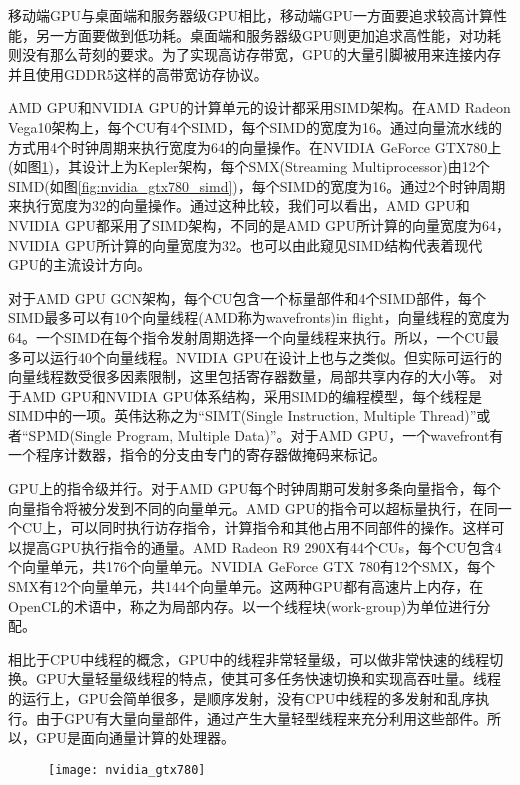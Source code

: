 移动端GPU与桌面端和服务器级GPU相比，移动端GPU一方面要追求较高计算性能，另一方面要做到低功耗。桌面端和服务器级GPU则更加追求高性能，对功耗则没有那么苛刻的要求。为了实现高访存带宽，GPU的大量引脚被用来连接内存并且使用GDDR5这样的高带宽访存协议。

AMD GPU和NVIDIA GPU的计算单元的设计都采用SIMD架构。在AMD Radeon Vega10架构上，每个CU有4个SIMD，每个SIMD的宽度为16。通过向量流水线的方式用4个时钟周期来执行宽度为64的向量操作。在NVIDIA GeForce GTX780上(如图\ref{fig:nvidia_gtx780})，其设计上为Kepler架构，每个SMX(Streaming Multiprocessor)由12个SIMD(如图\ref{fig:nvidia_gtx780_simd})，每个SIMD的宽度为16。通过2个时钟周期来执行宽度为32的向量操作。通过这种比较，我们可以看出，AMD GPU和NVIDIA GPU都采用了SIMD架构，不同的是AMD GPU所计算的向量宽度为64，NVIDIA GPU所计算的向量宽度为32。也可以由此窥见SIMD结构代表着现代GPU的主流设计方向。

对于AMD GPU GCN架构，每个CU包含一个标量部件和4个SIMD部件，每个SIMD最多可以有10个向量线程(AMD称为wavefronts)in flight，向量线程的宽度为64。一个SIMD在每个指令发射周期选择一个向量线程来执行。所以，一个CU最多可以运行40个向量线程。NVIDIA GPU在设计上也与之类似。但实际可运行的向量线程数受很多因素限制，这里包括寄存器数量，局部共享内存的大小等。
对于AMD GPU和NVIDIA GPU体系结构，采用SIMD的编程模型，每个线程是SIMD中的一项。英伟达称之为“SIMT(Single Instruction, Multiple Thread)”或者“SPMD(Single Program, Multiple Data)”。对于AMD GPU，一个wavefront有一个程序计数器，指令的分支由专门的寄存器做掩码来标记。

GPU上的指令级并行。对于AMD GPU每个时钟周期可发射多条向量指令，每个向量指令将被分发到不同的向量单元。AMD GPU的指令可以超标量执行，在同一个CU上，可以同时执行访存指令，计算指令和其他占用不同部件的操作。这样可以提高GPU执行指令的通量。AMD Radeon R9 290X有44个CUs，每个CU包含4个向量单元，共176个向量单元。NVIDIA GeForce GTX 780有12个SMX，每个SMX有12个向量单元，共144个向量单元。这两种GPU都有高速片上内存，在OpenCL的术语中，称之为局部内存。以一个线程块(work-group)为单位进行分配。

相比于CPU中线程的概念，GPU中的线程非常轻量级，可以做非常快速的线程切换。GPU大量轻量级线程的特点，使其可多任务快速切换和实现高吞吐量。线程的运行上，GPU会简单很多，是顺序发射，没有CPU中线程的多发射和乱序执行。由于GPU有大量向量部件，通过产生大量轻型线程来充分利用这些部件。所以，GPU是面向通量计算的处理器。
\begin{figure}[htbp]
	\centering
	\texttt{[image: nvidia\_gtx780]}
	\label{fig:nvidia_gtx780}
\end{figure}

